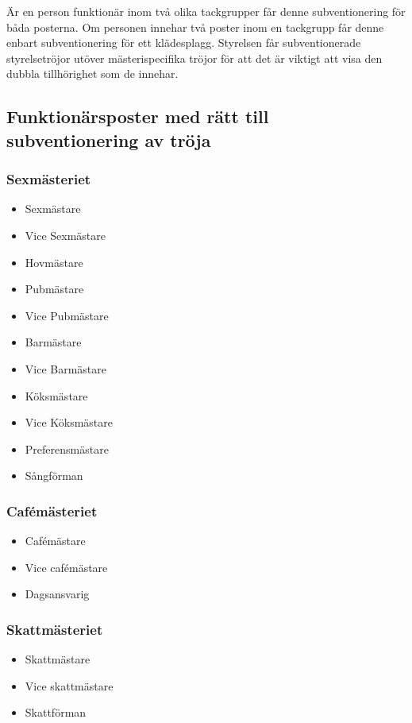 \documentclass{dsekprotokoll}
\begin{document}
\par Är en person funktionär inom två olika tackgrupper får denne subventionering för båda posterna. Om personen innehar två poster inom en tackgrupp får denne enbart subventionering för ett klädesplagg. Styrelsen får subventionerade styrelsetröjor utöver mästerispecifika tröjor för att det är viktigt att visa den dubbla tillhörighet som de innehar.

\subsection{Funktionärsposter med rätt till subventionering av tröja}
\begin{multicols}{2}
  \subsubsection*{Sexmästeriet}
  \begin{itemize}
    \item Sexmästare
    \item Vice Sexmästare
    \item Hovmästare
    \item Pubmästare
    \item Vice Pubmästare
    \item Barmästare
    \item Vice Barmästare
    \item Köksmästare
    \item Vice Köksmästare
    \item Preferensmästare
    \item Sångförman
  \end{itemize}
  \subsubsection*{Cafémästeriet}
  \begin{itemize}
    \item Cafémästare
    \item Vice cafémästare
    \item Dagsansvarig
  \end{itemize}
  \subsubsection*{Skattmästeriet}
  \begin{itemize}
    \item Skattmästare
    \item Vice skattmästare
    \item Skattförman
  \end{itemize}

\end{multicols}
\end{document}
